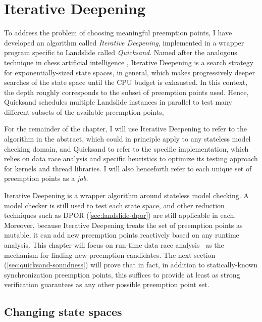 \section{Iterative Deepening}
\label{sec:quicksand-id}

To address the problem of choosing meaningful preemption points,
I have developed an algorithm called {\em Iterative Deepening},
implemented in a wrapper program specific to Landslide called {\em Quicksand}.
Named after the analogous technique in chess artificial intelligence \cite{iterative-deepening-chess-ai},
Iterative Deepening
is a search strategy
for exponentially-sized state spaces, in general,
which
makes progressively deeper searches of the state space until the CPU budget is exhausted.
In this context, the depth roughly corresponds to the subset of preemption points used.
Hence, Quicksand
schedules multiple Landslide instances in parallel to
test many different subsets of the available preemption points,

For the remainder of the chapter, I will use Iterative Deepening to refer to the algorithm in the abstract,
which could in principle apply to any stateless model checking domain,
and Quicksand to refer to the specific implementation,
which relies on data race analysis and specific heuristics to optimize its testing approach
for kernels and thread libraries.
I will also henceforth refer to each unique set of preemption points as a {\em job}.

Iterative Deepening is a wrapper algorithm around stateless model checking.
A model checker is still used to test each state space, and other reduction techniques such as DPOR
(\cref{sec:landslide-dpor})
are still applicable in each.
Moreover, because Iterative Deepening treats the set of preemption points as mutable,
it can add new preemption points reactively based on any runtime analysis.
This chapter
will focus on run-time data race analysis~\cite{tsan,fasttrack} as the mechanism for finding new preemption candidates.
The next section (\cref{sec:quicksand-soundness})
will prove that in fact,
in addition to statically-known synchronization preemption points,
this suffices to provide at least as strong verification guarantees as any other possible preemption point set.


\subsection{Changing state spaces}

